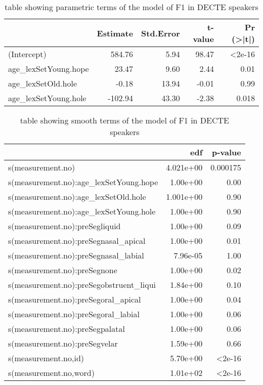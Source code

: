 \documentclass[../../../00.FullDoc/tex/Thesis]{subfiles}
\begin{document}
\begin{table}[htbp]
	\centering
	\begin{tabular}{lrrrr}
		\hline
		& Estimate & Std.Error & t-value & Pr (>|t|) \\
		\hline
		(Intercept) & 584.76 & 5.94 & 98.47 & <2e-16 \\
		age\_lexSetYoung.hope & 23.47 & 9.60 & 2.44 & 0.01 \\
		age\_lexSetOld.hole & -0.18 & 13.94 & -0.01 & 0.99  \\
		age\_lexSetYoung.hole & -102.94 & 43.30 & -2.38 & 0.018 \\	
		\hline
	\end{tabular}%
	\caption{table showing parametric terms of the model of F1 in DECTE speakers}
	\label{tbl:GGF1DE-para}%
\end{table}%

\begin{table}[htbp]
	\centering
	\begin{tabular}{lrr}
		\hline
		& edf & p-value \\
		\hline
		s(measurement.no) & 4.021e+00 & 0.000175 \\
		s(measurement.no):age\_lexSetYoung.hope & 1.00e+00 & 0.00 \\
		s(measurement.no):age\_lexSetOld.hole & 1.001e+00 & 0.90 \\
		s(measurement.no):age\_lexSetYoung.hole & 1.00e+00 & 0.90 \\
		s(measurement.no):preSegliquid & 1.00e+00 & 0.09 \\
		s(measurement.no):preSegnasal\_apical & 1.00e+00 & 0.01 \\
		s(measurement.no):preSegnasal\_labial & 7.96e-05 & 1.00 \\
		s(measurement.no):preSegnone & 1.00e+00 & 0.02 \\
		s(measurement.no):preSegobstruent\_liqui & 1.84e+00 & 0.10 \\
		s(measurement.no):preSegoral\_apical & 1.00e+00 & 0.04 \\
		s(measurement.no):preSegoral\_labial & 1.00e+00 & 0.06 \\
		s(measurement.no):preSegpalatal & 1.00e+00 & 0.06 \\
		s(measurement.no):preSegvelar & 1.59e+00 & 0.66 \\
		s(measurement.no,id) & 5.70e+00 & <2e-16 \\
		s(measurement.no,word) & 1.01e+02 & <2e-16 \\
		\hline
	\end{tabular}
	\caption{table showing smooth terms of the model of F1 in DECTE speakers}
	\label{tbl:GGF1DE-smooth}
\end{table}
\end{document}
